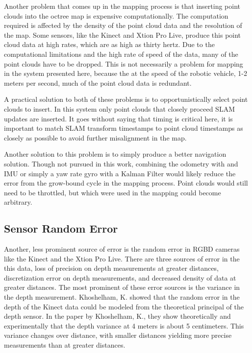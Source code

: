 \documentclass[12pt]{report}
\begin{document}
Another problem that comes up in the mapping process is that inserting point clouds into the octree map is expensive computationally.  The computation required is affected by the density of the point cloud data and the resolution of the map.  Some sensors, like the Kinect and Xtion Pro Live, produce this point cloud data at high rates, which are as high as thirty hertz.  Due to the computational limitations and the high rate of speed of the data, many of the point clouds have to be dropped.  This is not necessarily a problem for mapping in the system presented here, because the at the speed of the robotic vehicle, 1-2 meters per second, much of the point cloud data is redundant.

A practical solution to both of these problems is to opportunistically select point clouds to insert.  In this system only point clouds that closely proceed SLAM updates are inserted.  It goes without saying that timing is critical here, it is important to match SLAM transform timestamps to point cloud timestamps as closely as possible to avoid further misalignment in the map.

Another solution to this problem is to simply produce a better navigation solution.  Though not pursued in this work, combining the odometry with and IMU or simply a yaw rate gyro with a Kalman Filter would likely reduce the error from the grow-bound cycle in the mapping process.  Point clouds would still need to be throttled, but which were used in the mapping could become arbitrary.

\subsection{Sensor Random Error}
Another, less prominent source of error is the random error in RGBD cameras like the Kinect and the Xtion Pro Live.  There are three sources of error in the this data, loss of precision on depth measurements at greater distances, discretization error on depth measurements, and decreased density of data at greater distances.  The most prominent of these error sources is the variance in the depth measurement.  Khoshelham, K. showed that the random error in the depth of the Kinect data could be modeled from the theoretical principal of the depth sensor\cite{khoshelham2011accuracy}.  In the paper by Khoshelham, K., they show theoretically and experimentally that the depth variance at 4 meters is about 5 centimeters.  This variance changes over distance, with smaller distances yielding more precise measurements than at greater distances.
\end{document}
